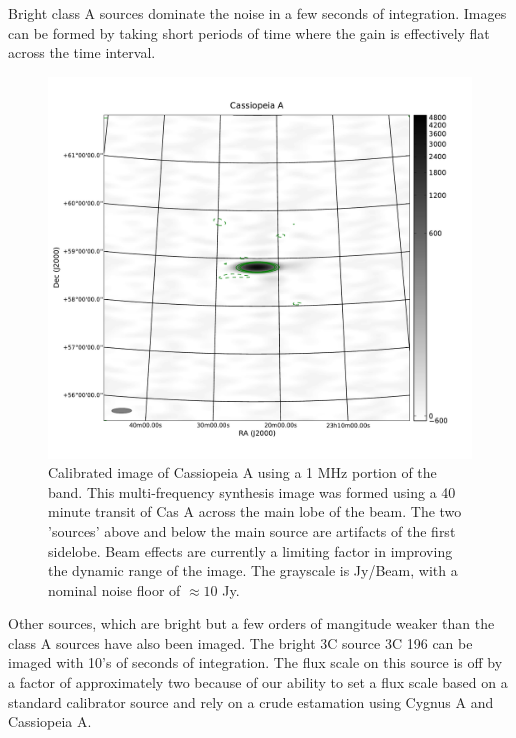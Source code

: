 \documentclass[useAMS,usenatbib,onecolumn]{mn2e}
\begin{document}
Bright class A sources dominate the noise in a few seconds of integration.
Images can be formed by taking short periods of time where the gain is effectively flat across the time interval.

\begin{figure}
    \centering
    \includegraphics[scale=0.6]{graphics/cas_1319623663.pdf}
    \caption{Calibrated image of Cassiopeia A using a 1 MHz portion of the band. This multi-frequency synthesis image was formed using a 40 minute transit of Cas A across the main lobe of the beam.
    The two 'sources' above and below the main source are artifacts of the first sidelobe. Beam effects are currently a limiting factor in improving the dynamic range of the image.
    The grayscale is Jy/Beam, with a nominal noise floor of $\approx 10$ Jy.}
    \label{fig:cas_a_corr}
\end{figure}

Other sources, which are bright but a few orders of mangitude weaker than the class A sources have also been imaged.
The bright 3C source 3C 196 can be imaged with 10's of seconds of integration.
The flux scale on this source is off by a factor of approximately two because of our ability to set a flux scale based on a standard calibrator source and rely on a crude estamation using Cygnus A and Cassiopeia A.
\end{document}
